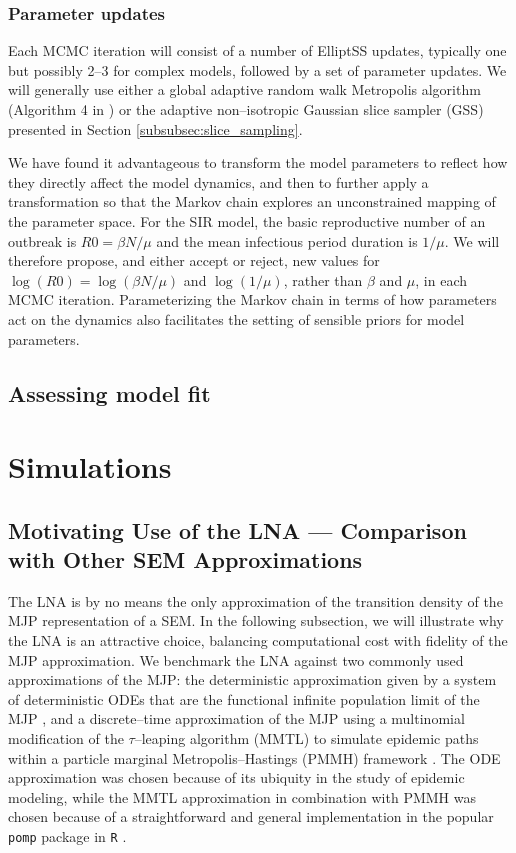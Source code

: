 \subsubsection{Parameter updates}
\label{subsubsec:lna_param_updates}
Each MCMC iteration will consist of a number of ElliptSS updates, typically one but possibly 2--3 for complex models, followed by a set of parameter updates. We will generally use either a global adaptive random walk Metropolis algorithm (Algorithm 4 in \cite{andrieu2008tutorial}) or the adaptive non--isotropic Gaussian slice sampler (GSS) presented in Section \ref{subsubsec:slice_sampling}. 

We have found it advantageous to transform the model parameters to reflect how they directly affect the model dynamics, and then to further apply a transformation so that the Markov chain explores an unconstrained mapping of the parameter space. For the SIR model, the basic reproductive number of an outbreak is $ R0 = \beta N /\mu $ and the mean infectious period duration is $ 1/\mu $. We will therefore propose, and either accept or reject, new values for $ \log(R0) = \log(\beta N / \mu) $ and $ \log(1/\mu) $, rather than $ \beta $ and $ \mu $, in each MCMC iteration. Parameterizing the Markov chain in terms of how parameters act on the dynamics also facilitates the setting of sensible priors for model parameters. 

\subsection{Assessing model fit}
\label{subsec:lna_model_diags}

\section{Simulations}
\label{sec:lna_simulations}

\subsection{Motivating Use of the LNA --- Comparison with Other SEM Approximations}
\label{subsec:lna_coverage}

The LNA is by no means the only approximation of the transition density of the MJP representation of a SEM. In the following subsection, we will illustrate why the LNA is an attractive choice, balancing computational cost with fidelity of the MJP approximation. We benchmark the LNA against two commonly used approximations of the MJP: the deterministic approximation given by a system of deterministic ODEs that are the functional infinite population limit of the MJP \cite{fuchs2013inference}, and a discrete--time approximation of the MJP using a multinomial modification of the $ \tau $--leaping algorithm (MMTL) \cite{breto2011compound} to simulate epidemic paths within a particle marginal Metropolis--Hastings (PMMH) framework \cite{andrieu2010particle}. The ODE approximation was chosen because of its ubiquity in the study of epidemic modeling, while the MMTL approximation in combination with PMMH was chosen because of a straightforward and general implementation in the popular \texttt{pomp} package in \texttt{R} \cite{pompjss}. 

